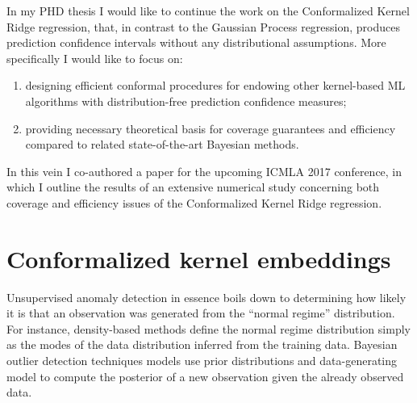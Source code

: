 \documentclass{extarticle}
\begin{document}
In my PHD thesis I would like to continue the work on the Conformalized Kernel Ridge
regression, that, in contrast to the Gaussian Process regression, produces prediction
confidence intervals without any distributional assumptions. More specifically I
would like to focus on: \begin{enumerate}
  \item designing efficient conformal procedures for endowing other kernel-based
  ML algorithms with distribution-free prediction confidence measures;
  \item providing necessary theoretical basis for coverage guarantees and efficiency
  compared to related state-of-the-art Bayesian methods.
\end{enumerate}

In this vein I co-authored a paper for the upcoming ICMLA 2017 conference, in which
I outline the results of an extensive numerical study concerning both coverage and
efficiency issues of the Conformalized Kernel Ridge regression.


\section{Conformalized kernel embeddings} %
\label{sec:conformalized_kernel_embeddings}


Unsupervised anomaly detection in essence boils down to determining how likely it
is that an observation was generated from the ``normal regime'' distribution. For
instance, density-based methods define the normal regime distribution simply as
the modes of the data distribution inferred from the training data. Bayesian outlier
detection techniques models use prior distributions and data-generating model to
compute the posterior of a new observation given the already observed data.
\end{document}
